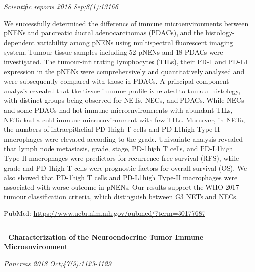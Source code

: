 \documentclass[]{article}
\begin{document}
\emph{Scientific reports 2018 Sep;8(1):13166}

We successfully determined the difference of immune microenvironments
between pNENs and pancreatic ductal adenocarcinomas (PDACs), and the
histology-dependent variability among pNENs using multispectral
fluorescent imaging system. Tumour tissue samples including 52 pNENs and
18 PDACs were investigated. The tumour-infiltrating lymphocytes (TILs),
their PD-1 and PD-L1 expression in the pNENs were comprehensively and
quantitatively analysed and were subsequently compared with those in
PDACs. A principal component analysis revealed that the tissue immune
profile is related to tumour histology, with distinct groups being
observed for NETs, NECs, and PDACs. While NECs and some PDACs had hot
immune microenvironments with abundant TILs, NETs had a cold immune
microenvironment with few TILs. Moreover, in NETs, the numbers of
intraepithelial PD-1high T cells and PD-L1high Type-II macrophages were
elevated according to the grade. Univariate analysis revealed that lymph
node metastasis, grade, stage, PD-1high T cells, and PD-L1high Type-II
macrophages were predictors for recurrence-free survival (RFS), while
grade and PD-1high T cells were prognostic factors for overall survival
(OS). We also showed that PD-1high T cells and PD-L1high Type-II
macrophages were associated with worse outcome in pNENs. Our results
support the WHO 2017 tumour classification criteria, which distinguish
between G3 NETs and NECs.

PubMed: \url{https://www.ncbi.nlm.nih.gov/pubmed/?term=30177687}

{}

{}

\begin{center}\rule{0.5\linewidth}{\linethickness}\end{center}

 - \textbf{Characterization of the Neuroendocrine Tumor Immune
Microenvironment}

\emph{Pancreas 2018 Oct;47(9):1123-1129}
\end{document}
